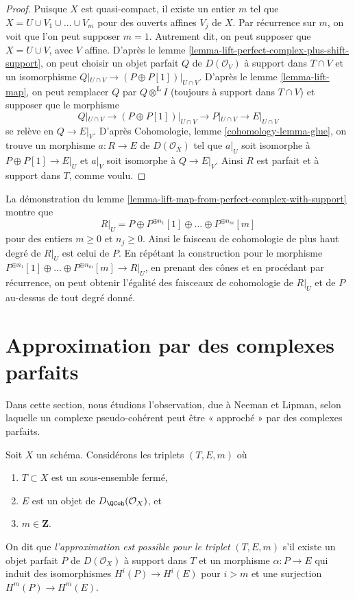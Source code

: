 \begin{proof}
Puisque $X$ est quasi-compact, il existe un entier $m$ tel que
$X = U \cup V_1 \cup \ldots \cup V_m$ pour des ouverts affines $V_j$ de $X$.
Par récurrence sur $m$, on voit que l'on peut supposer $m = 1$. Autrement
dit, on peut supposer que $X = U \cup V$, avec $V$ affine. D'après le
lemme \ref{lemma-lift-perfect-complex-plus-shift-support},
on peut choisir un objet parfait $Q$ de $D(\mathcal{O}_V)$
à support dans $T \cap V$ et un isomorphisme
$Q|_{U \cap V} \to (P \oplus P[1])|_{U \cap V}$.
D'après le lemme \ref{lemma-lift-map}, on peut remplacer $Q$ par
$Q \otimes^\mathbf{L} I$ (toujours à support dans $T \cap V$)
et supposer que le morphisme
$$
Q|_{U \cap V} \to (P \oplus P[1])|_{U \cap V}
\longrightarrow P|_{U \cap V}
\longrightarrow
E|_{U \cap V}
$$
se relève en $Q \to E|_V$. D'après
Cohomologie, lemme \ref{cohomology-lemma-glue},
on trouve un morphisme $a : R \to E$ de $D(\mathcal{O}_X)$
tel que $a|_U$ soit isomorphe à $P \oplus P[1] \to E|_U$
et $a|_V$ soit isomorphe à $Q \to E|_V$.
Ainsi $R$ est parfait et à support dans $T$, comme voulu.
\end{proof}

\begin{remark}
\label{remark-addendum}
La démonstration du lemme \ref{lemma-lift-map-from-perfect-complex-with-support}
montre que
$$
R|_U = P \oplus P^{\oplus n_1}[1] \oplus \ldots \oplus P^{\oplus n_m}[m]
$$
pour des entiers $m \geq 0$ et $n_j \geq 0$. Ainsi le faisceau de cohomologie
de plus haut degré de $R|_U$ est celui de $P$. En répétant la construction pour le morphisme
$P^{\oplus n_1}[1] \oplus \ldots \oplus P^{\oplus n_m}[m] \to R|_U$, en prenant
des cônes et en procédant par récurrence, on peut obtenir l'égalité des faisceaux de cohomologie
de $R|_U$ et de $P$ au-dessus de tout degré donné.
\end{remark}



\section{Approximation par des complexes parfaits}
\label{section-approximation}

\noindent
Dans cette section, nous étudions l'observation, due à Neeman et Lipman,
selon laquelle un complexe pseudo-cohérent peut être « approché » par des complexes parfaits.

\begin{definition}
\label{definition-approximation-holds}
Soit $X$ un schéma. Considérons les triplets $(T, E, m)$ où
\begin{enumerate}
\item $T \subset X$ est un sous-ensemble fermé,
\item $E$ est un objet de $D_\QCoh(\mathcal{O}_X)$, et
\item $m \in \mathbf{Z}$.
\end{enumerate}
On dit que {\it l'approximation est possible pour le triplet} $(T, E, m)$ s'il
existe un objet parfait $P$ de $D(\mathcal{O}_X)$ à support dans $T$
et un morphisme $\alpha : P \to E$ qui induit des isomorphismes $H^i(P) \to H^i(E)$
pour $i > m$ et une surjection $H^m(P) \to H^m(E)$.
\end{definition}


